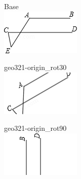 \documentclass[12pt]{article}
\begin{document}
\begin{center}
\begin{minipage}{0.32\textwidth}\centering
Base\\
\includegraphics[width=0.95\linewidth]{out_rommath_origin/items/geo321-origin/assets/figure.png}
\end{minipage}
\hfill\begin{minipage}{0.32\textwidth}\centering
geo321-origin\_rot30\\
\includegraphics[width=0.95\linewidth]{out_rommath_origin/items/geo321-origin/assets/figure_rot30.png}
\end{minipage}
\hfill\begin{minipage}{0.32\textwidth}\centering
geo321-origin\_rot90\\
\includegraphics[width=0.95\linewidth]{out_rommath_origin/items/geo321-origin/assets/figure_rot90.png}

\end{minipage}
\end{center}
\end{document}
